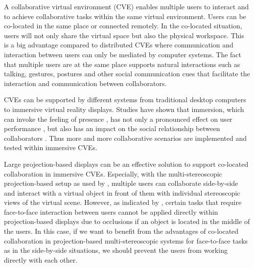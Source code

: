A collaborative virtual environment (CVE) \citep{Benford2001CVE} enables multiple users to interact \citep{Schroeder2006Usability} and to achieve collaborative tasks \citep{Dodds2009Using} within the same virtual environment. Users can be co-located in the same place or connected remotely. In the co-located situation, users will not only share the virtual space but also the physical workspace. This is a big advantage compared to distributed CVEs where communication and interaction between users can only be mediated by computer systems. The fact that multiple users are at the same place supports natural interactions such as talking, gestures, postures and other social communication cues that facilitate the interaction and communication between collaborators.

CVEs can be supported by different systems from traditional desktop computers to immersive virtual reality displays. Studies have shown that immersion, which can invoke the feeling of presence \citep{Slater1994DepthPre}, has not only a pronounced effect on user performance \citep{Dangelo2008Benefits}, but also has an impact on the social relationship between collaborators \citep{Slater2000Small}. Thus more and more collaborative scenarios are implemented and tested within immersive CVEs.

Large projection-based displays can be an effective solution to support co-located collaboration in immersive CVEs. Especially, with the multi-stereoscopic projection-based setup as used by \citet{Salzmann2009VRPointing}, multiple users can collaborate side-by-side and interact with a virtual object in front of them with individual stereoscopic views of the virtual scene. However, as indicated by \citet{Salzmann2009CIC}, certain tasks that require face-to-face interaction between users cannot be applied directly within projection-based displays due to occlusions if an object is located in the middle of the users. In this case, if we want to benefit from the advantages of co-located collaboration in projection-based multi-stereoscopic systems for face-to-face tasks as in the side-by-side situations, we should prevent the users from working directly with each other.

